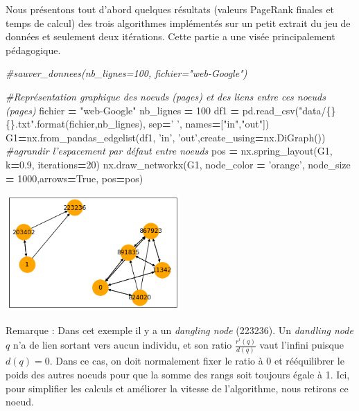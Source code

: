 \documentclass[10pt,a4paper]{article}
\newenvironment{Shaded}{\begin{snugshade}}{\end{snugshade}}
\newcommand{\BuiltInTok}[1]{#1}
\newcommand{\CommentTok}[1]{\textcolor[rgb]{0.56,0.35,0.01}{\textit{#1}}}
\newcommand{\DecValTok}[1]{\textcolor[rgb]{0.00,0.00,0.81}{#1}}
\newcommand{\FloatTok}[1]{\textcolor[rgb]{0.00,0.00,0.81}{#1}}
\newcommand{\NormalTok}[1]{#1}
\newcommand{\OperatorTok}[1]{\textcolor[rgb]{0.81,0.36,0.00}{\textbf{#1}}}
\newcommand{\SpecialCharTok}[1]{\textcolor[rgb]{0.00,0.00,0.00}{#1}}
\newcommand{\StringTok}[1]{\textcolor[rgb]{0.31,0.60,0.02}{#1}}
\newcommand{\VariableTok}[1]{\textcolor[rgb]{0.00,0.00,0.00}{#1}}
\theoremstyle{break}
\begin{document}
Nous présentons tout d'abord quelques résultats (valeurs PageRank finales et temps de calcul) des trois algorithmes implémentés sur un petit extrait du jeu de données et seulement deux itérations. Cette partie a une visée principalement pédagogique.

\begin{Shaded}
\begin{Highlighting}[]
\CommentTok{#sauver_donnees(nb_lignes=100, fichier="web-Google") }

\CommentTok{#Représentation graphique des noeuds (pages) et des liens entre ces noeuds (pages)}
\NormalTok{fichier }\OperatorTok{=} \StringTok{"web-Google"}
\NormalTok{nb_lignes }\OperatorTok{=} \DecValTok{100}
\NormalTok{df1 }\OperatorTok{=}\NormalTok{ pd.read_csv(}\StringTok{"data/}\SpecialCharTok{\{\}\{\}}\StringTok{.txt"}\NormalTok{.}\BuiltInTok{format}\NormalTok{(fichier,nb_lignes),}
\NormalTok{                  sep}\OperatorTok{=}\StringTok{' '}\NormalTok{, names}\OperatorTok{=}\NormalTok{[}\StringTok{"in"}\NormalTok{,}\StringTok{"out"}\NormalTok{])}
\NormalTok{G1}\OperatorTok{=}\NormalTok{nx.from_pandas_edgelist(df1, }\StringTok{'in'}\NormalTok{, }\StringTok{'out'}\NormalTok{,create_using}\OperatorTok{=}\NormalTok{nx.DiGraph())}
\CommentTok{#agrandir l'espacement par défaut entre noeuds}
\NormalTok{pos }\OperatorTok{=}\NormalTok{ nx.spring_layout(G1, k}\OperatorTok{=}\FloatTok{0.9}\NormalTok{, iterations}\OperatorTok{=}\DecValTok{20}\NormalTok{)}
\NormalTok{nx.draw_networkx(G1, node_color }\OperatorTok{=} \StringTok{'orange'}\NormalTok{, }
\NormalTok{                 node_size }\OperatorTok{=} \DecValTok{1000}\NormalTok{,arrows}\OperatorTok{=}\VariableTok{True}\NormalTok{, pos}\OperatorTok{=}\NormalTok{pos)}
\end{Highlighting}
\end{Shaded}

\begin{center}
\includegraphics[width=0.5\textwidth]{img/DocPageRank_files/DocPageRank_20_0.png}
\end{center}

Remarque : Dans cet exemple il y a un \emph{dangling node} (223236). Un \emph{dandling node} \(q\) n'a de lien sortant vers aucun individu, et son ratio \(\frac{r^{i}(q)}{d(q)}\) vaut l'infini puisque \(d(q)=0\). Dans ce cas, on doit normalement fixer le ratio à \(0\) et rééquilibrer le poids des autres noeuds pour que la somme des rangs soit toujours égale à 1. Ici, pour simplifier les calculs et améliorer la vitesse de l'algorithme, nous retirons ce noeud.
\end{document}
